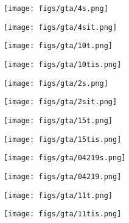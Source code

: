 \documentclass[letterpaper]{article} \usepackage[]{aaai23}  \usepackage{times}  \usepackage{helvet}  \usepackage{courier}  \usepackage[hyphens]{url}  \usepackage{graphicx} \urlstyle{rm} \def\UrlFont{\rm}  \usepackage{natbib}  \usepackage{caption} \frenchspacing  \setlength{\pdfpagewidth}{8.5in} \setlength{\pdfpageheight}{11in} \usepackage{algorithm}
\begin{document}
\begin{figure*}
\centering
    \begin{subfigure}{0.24\linewidth}
        \centering
        \texttt{[image: figs/gta/4s.png]}
    \end{subfigure}
    \begin{subfigure}{0.24\linewidth}
        \centering
        \texttt{[image: figs/gta/4sit.png]}
    \end{subfigure}
    \begin{subfigure}{0.24\linewidth}
        \centering
        \texttt{[image: figs/gta/10t.png]}
    \end{subfigure}
    \begin{subfigure}{0.24\linewidth}
        \centering
        \texttt{[image: figs/gta/10tis.png]}
    \end{subfigure}
    
    \begin{subfigure}{0.24\linewidth}
        \centering
        \texttt{[image: figs/gta/2s.png]}
    \end{subfigure}
    \begin{subfigure}{0.24\linewidth}
        \centering
        \texttt{[image: figs/gta/2sit.png]}
    \end{subfigure}
    \begin{subfigure}{0.24\linewidth}
        \centering
        \texttt{[image: figs/gta/15t.png]}
    \end{subfigure}
    \begin{subfigure}{0.24\linewidth}
        \centering
        \texttt{[image: figs/gta/15tis.png]}
    \end{subfigure}
    
    \begin{subfigure}{0.24\linewidth}
        \centering
        \texttt{[image: figs/gta/04219s.png]}
    \end{subfigure}
    \begin{subfigure}{0.24\linewidth}
        \centering
        \texttt{[image: figs/gta/04219.png]}
    \end{subfigure}
    \begin{subfigure}{0.24\linewidth}
        \centering
        \texttt{[image: figs/gta/11t.png]}
    \end{subfigure}
    \begin{subfigure}{0.24\linewidth}
        \centering
        \texttt{[image: figs/gta/11tis.png]}
    \end{subfigure}
    

\end{figure*}
\end{document}
